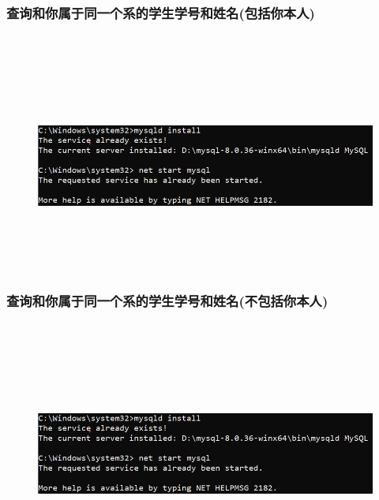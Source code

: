 \documentclass{ctexart}
\begin{document}
\subsubsection{查询和你属于同一个系的学生学号和姓名(包括你本人)}
\begin{lstlisting}[language=sql]
	
\end{lstlisting}
\begin{figure}[H]
	\centering 
	\includegraphics[height=7cm,width=14cm]{1.png}
	\end{figure}
\subsubsection{查询和你属于同一个系的学生学号和姓名(不包括你本人)}
\begin{lstlisting}[language=sql]
	
\end{lstlisting}
\begin{figure}[H]
	\centering 
	\includegraphics[height=7cm,width=14cm]{1.png}
	\end{figure}
\end{document}
